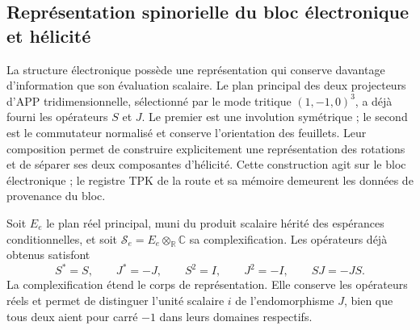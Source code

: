 \subsection{Représentation spinorielle du bloc électronique et hélicité}
\label{sec:el-representacion-espinorial}

La structure électronique possède une représentation qui conserve davantage
d'information que son évaluation scalaire. Le plan principal des deux
projecteurs d'APP tridimensionnelle, sélectionné par le mode tritique
\((1,-1,0)^3\), a déjà fourni les opérateurs \(S\) et \(J\).
Le premier est une involution symétrique ; le second est le commutateur
normalisé et conserve l'orientation des feuillets. Leur composition permet
de construire explicitement une représentation des rotations et de séparer ses
deux composantes d'hélicité. Cette construction agit sur le bloc
électronique ; le registre TPK de la route et sa mémoire demeurent les données
de provenance du bloc.

Soit \(E_e\) le plan réel principal, muni du produit scalaire hérité
des espérances conditionnelles, et soit
\(\mathscr S_e=E_e\otimes_{\mathbb R}\mathbb C\) sa complexification.
Les opérateurs déjà obtenus satisfont
\[
 S^*=S,\qquad J^*=-J,\qquad
 S^2=I,\qquad J^2=-I,\qquad SJ=-JS.
\]
La complexification étend le corps de représentation. Elle conserve les
opérateurs réels et permet de distinguer l'unité scalaire \(i\) de
l'endomorphisme \(J\), bien que tous deux aient pour carré \(-1\) dans leurs
domaines respectifs.

